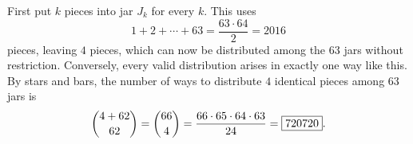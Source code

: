 First put $k$ pieces into jar $J_k$ for every $k$. This uses
\[1+2+\cdots+63=\dfrac{63\cdot64}{2}=2016\]
pieces, leaving $4$ pieces, which can now be distributed among the $63$ jars without restriction. Conversely, every valid distribution arises in exactly one way like this. By stars and bars, the number of ways to distribute $4$ identical pieces among $63$ jars is
\[\dbinom{4+62}{62}=\dbinom{66}{4}=\dfrac{66\cdot65\cdot64\cdot63}{24}=\boxed{720720}.\]
